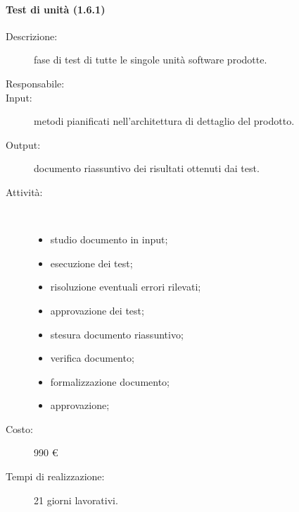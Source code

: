 \begin{description}
\paragraph{Test di unit\`{a} (1.6.1)}
\begin{description}
\item[Descrizione:] fase di test di tutte le singole unit\`{a} software prodotte.
\item[Responsabile:] 
\item[Input:] metodi pianificati nell'architettura di dettaglio del prodotto.
\item[Output:] documento riassuntivo dei risultati ottenuti dai test.
\item[Attività:]\mbox{}\\[-1.5\baselineskip]
	\begin{itemize}
	\item studio documento in input;
	\item esecuzione dei test;
	\item risoluzione eventuali errori rilevati;
	\item approvazione dei test;
	\item stesura documento riassuntivo;
	\item verifica documento;
	\item formalizzazione documento;
	\item approvazione;
	\end{itemize}
\item[Costo:] 990 \euro{}
\item[Tempi di realizzazione:] 21 giorni lavorativi.
\end{description}


\end{description}
